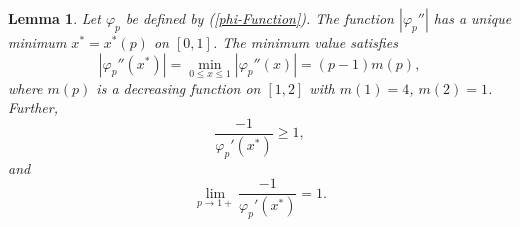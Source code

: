 \documentclass[10pt,a4paper]{amsart}
\newtheorem{lem}{Lemma}
\begin{document}
\begin{lem}
\label{x-p-lem}
Let $\varphi_p$ be defined by (\ref{phi-Function}). The function $|\varphi_p''|$ has a unique minimum $x^*= x^*(p)$ on $[0,1]$. The minimum value satisfies
\begin{equation}
    \label{phi-p2ndDerivMin1}
    |\varphi_p''(x^*)|=\min_{0\le x\le1}|\varphi_p''(x)|=(p-1)m(p),
\end{equation}
where $m(p)$ is a decreasing function on $[1,2]$ with $m(1)=4$, $m(2)=1$. Further,
\begin{equation}
    \label{x-p-lem1}
    \frac{-1}{\varphi_p'(x^*)}\ge1,
\end{equation}
and 
\begin{equation}
    \label{x-p-lem2}
    \lim_{p\rightarrow1+}\frac{-1}{\varphi_p'(x^*)}=1.
\end{equation}
\end{lem}
\end{document}
